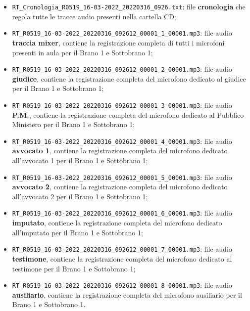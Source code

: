 \begin{itemize}
  \item \verb|RT_Cronologia_R0519_16-03-2022_20220316_0926.txt|: file \textbf{cronologia} che regola tutte le tracce audio presenti nella cartella CD;
  \item \verb|RT_R0519_16-03-2022_20220316_092612_00001_1_00001.mp3|: file audio \textbf{traccia mixer}, contiene la registrazione completa di tutti i microfoni presenti in aula per il Brano 1 e Sottobrano 1;
  \item \verb|RT_R0519_16-03-2022_20220316_092612_00001_2_00001.mp3|: file audio \textbf{giudice}, contiene la registrazione completa del microfono dedicato al giudice per il Brano 1 e Sottobrano 1;
  \item \verb|RT_R0519_16-03-2022_20220316_092612_00001_3_00001.mp3|: file audio \textbf{P.M.}, contiene la registrazione completa del microfono dedicato al Pubblico Ministero per il Brano 1 e Sottobrano 1;
  \item \verb|RT_R0519_16-03-2022_20220316_092612_00001_4_00001.mp3|: file audio \textbf{avvocato 1}, contiene la registrazione completa del microfono dedicato all'avvocato 1 per il Brano 1 e Sottobrano 1;
  \item \verb|RT_R0519_16-03-2022_20220316_092612_00001_5_00001.mp3|: file audio \textbf{avvocato 2}, contiene la registrazione completa del microfono dedicato all'avvocato 2 per il Brano 1 e Sottobrano 1;
  \item \verb|RT_R0519_16-03-2022_20220316_092612_00001_6_00001.mp3|: file audio \textbf{imputato}, contiene la registrazione completa del microfono dedicato all'imputato per il Brano 1 e Sottobrano 1;
  \item \verb|RT_R0519_16-03-2022_20220316_092612_00001_7_00001.mp3|: file audio \textbf{testimone}, contiene la registrazione completa del microfono dedicato al testimone per il Brano 1 e Sottobrano 1;
  \item \verb|RT_R0519_16-03-2022_20220316_092612_00001_8_00001.mp3|: file audio \textbf{ausiliario}, contiene la registrazione completa del microfono ausiliario per il Brano 1 e Sottobrano 1.
\end{itemize}

